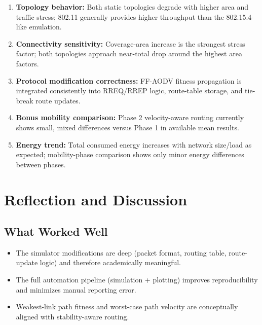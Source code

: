 \documentclass[12pt,a4paper]{article}
\begin{document}
\begin{enumerate}[leftmargin=1.5em]
    \item \textbf{Topology behavior:} Both static topologies degrade with higher area and traffic stress; 802.11 generally provides higher throughput than the 802.15.4-like emulation.
    \item \textbf{Connectivity sensitivity:} Coverage-area increase is the strongest stress factor; both topologies approach near-total drop around the highest area factors.
    \item \textbf{Protocol modification correctness:} FF-AODV fitness propagation is integrated consistently into RREQ/RREP logic, route-table storage, and tie-break route updates.
    \item \textbf{Bonus mobility comparison:} Phase 2 velocity-aware routing currently shows small, mixed differences versus Phase 1 in available mean results.
    \item \textbf{Energy trend:} Total consumed energy increases with network size/load as expected; mobility-phase comparison shows only minor energy differences between phases.
\end{enumerate}

\section{Reflection and Discussion}

\subsection{What Worked Well}
\begin{itemize}[leftmargin=1.5em]
    \item The simulator modifications are deep (packet format, routing table, route-update logic) and therefore academically meaningful.
    \item The full automation pipeline (simulation + plotting) improves reproducibility and minimizes manual reporting error.
    \item Weakest-link path fitness and worst-case path velocity are conceptually aligned with stability-aware routing.
\end{itemize}
\end{document}
